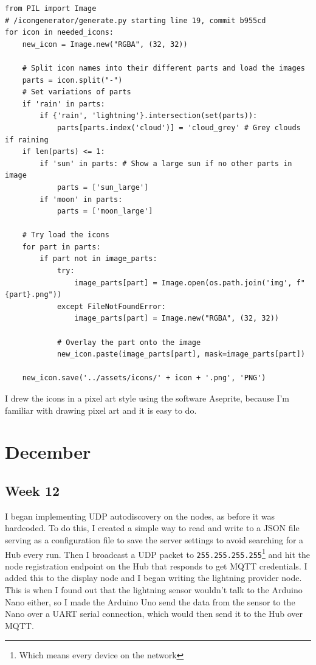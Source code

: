 \documentclass{report}
\begin{document}
		\begin{lstlisting}
from PIL import Image
# /icongenerator/generate.py starting line 19, commit b955cd			
for icon in needed_icons:
	new_icon = Image.new("RGBA", (32, 32))
	
	# Split icon names into their different parts and load the images
	parts = icon.split("-")
	# Set variations of parts
	if 'rain' in parts:
		if {'rain', 'lightning'}.intersection(set(parts)):
			parts[parts.index('cloud')] = 'cloud_grey' # Grey clouds if raining
	if len(parts) <= 1:
		if 'sun' in parts: # Show a large sun if no other parts in image
			parts = ['sun_large']
		if 'moon' in parts:
			parts = ['moon_large']
	
	# Try load the icons
	for part in parts:
		if part not in image_parts:
			try:
				image_parts[part] = Image.open(os.path.join('img', f"{part}.png"))
			except FileNotFoundError:
				image_parts[part] = Image.new("RGBA", (32, 32))
			
			# Overlay the part onto the image
			new_icon.paste(image_parts[part], mask=image_parts[part])
	
	new_icon.save('../assets/icons/' + icon + '.png', 'PNG')
		\end{lstlisting}
		
		I drew the icons in a pixel art style using the software Aseprite, because I'm familiar with drawing pixel art and it is easy to do.
		
		\chapter{December}
		\section{Week 12} %
		I began implementing UDP autodiscovery on the nodes, as before it was hardcoded. To do this, I created a simple way to read and write to a JSON file serving as a configuration file to save the server settings to avoid searching for a Hub every run. Then I broadcast a UDP packet to \texttt{255.255.255.255}\footnote{Which means every device on the network} and hit the node registration endpoint on the Hub that responds to get MQTT credentials. I added this to the display node and I began writing the lightning provider node. This is when I found out that the lightning sensor wouldn't talk to the Arduino Nano either, so I made the Arduino Uno send the data from the sensor to the Nano over a UART serial connection, which would then send it to the Hub over MQTT.
		
\end{document}
